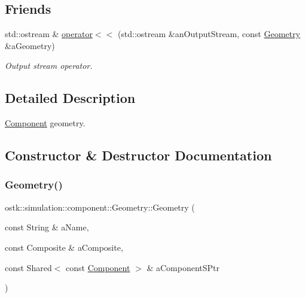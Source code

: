 \subsection*{Friends}
\begin{DoxyCompactItemize}
\item 
std\+::ostream \& \hyperlink{classostk_1_1simulation_1_1component_1_1_geometry_aebfe5b9b5d8cd3dd8a2cfd140a1df583}{operator$<$$<$} (std\+::ostream \&an\+Output\+Stream, const \hyperlink{classostk_1_1simulation_1_1component_1_1_geometry}{Geometry} \&a\+Geometry)
\begin{DoxyCompactList}\small\item\em Output stream operator. \end{DoxyCompactList}\end{DoxyCompactItemize}


\subsection{Detailed Description}
\hyperlink{classostk_1_1simulation_1_1_component}{Component} geometry. 

\subsection{Constructor \& Destructor Documentation}
\mbox{\label{classostk_1_1simulation_1_1component_1_1_geometry_a8a5e6c898e651ac1e113d6e916f0583e}} 
\subsubsection{\texorpdfstring{Geometry()}{Geometry()}}
{\footnotesize\ttfamily ostk\+::simulation\+::component\+::\+Geometry\+::\+Geometry (\begin{DoxyParamCaption}\item[{const String \&}]{a\+Name,  }\item[{const Composite \&}]{a\+Composite,  }\item[{const Shared$<$ const \hyperlink{classostk_1_1simulation_1_1_component}{Component} $>$ \&}]{a\+Component\+S\+Ptr }\end{DoxyParamCaption})}



